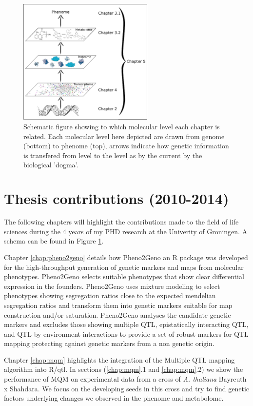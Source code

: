 \begin{figure}[h!]
 \centering
    \includegraphics[width=0.6\textwidth]{eps/image_1_3}
  \caption[ThesisLayout.]
    {Schematic figure showing to which molecular level each chapter is related. Each molecular 
    level here depicted are drawn from genome (bottom) to phenome (top), arrows indicate 
    how genetic information is transfered from level to the level as by the current by 
    the biological 'dogma'.}
    \label{fig:layout}
\end{figure}

\section{Thesis contributions (2010-2014)}
The following chapters will highlight the contributions made to the field of life 
sciences during the 4 years of my PHD research at the Univerity of Groningen. A schema 
can be found in Figure \ref{fig:layout}.

Chapter \ref{chap:pheno2geno} details how Pheno2Geno an R package was developed for 
the high-throughput generation of genetic markers and maps from molecular phenotypes. 
Pheno2Geno selects suitable phenotypes that show clear differential expression in the founders. Pheno2Geno 
uses mixture modeling to select phenotypes showing segregation ratios close to the 
expected mendelian segregation ratios and transform them into genetic markers suitable 
for map construction and/or saturation. Pheno2Geno analyses the candidate genetic 
markers and excludes those showing multiple QTL, epistatically interacting QTL, and QTL 
by environment interactions to provide a set of robust markers for QTL mapping protecting 
against genetic markers from a non genetic origin.

Chapter \ref{chap:mqm} highlights the integration of the Multiple QTL mapping algorithm 
into R/qtl. In sections (\ref{chap:mqm}.1 and  \ref{chap:mqm}.2) we show the performance 
of MQM on experimental data from a cross of \emph{A. thaliana} Bayreuth x Shahdara. We 
focus on the developing seeds in this cross and try to find genetic factors underlying 
changes we observed in the phenome and metabolome.

